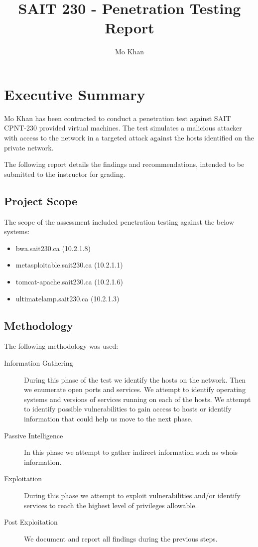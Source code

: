\documentclass{article}
\title{SAIT 230 - Penetration Testing Report}
\author{Mo Khan}
\begin{document}
\maketitle
\newpage
\tableofcontents
\newpage
{}

\section{Executive Summary}

Mo Khan has been contracted to conduct a penetration test against SAIT CPNT-230 provided
virtual machines. The test simulates a malicious attacker with access to the
network in a targeted attack against the hosts identified on the private network.

The following report details the findings and recommendations, intended to be submitted
to the instructor for grading.

\subsection{Project Scope}

The scope of the assessment included penetration testing against the below systems:

\begin{itemize}
  \item bwa.sait230.ca (10.2.1.8)
  \item metasploitable.sait230.ca (10.2.1.1)
  \item tomcat-apache.sait230.ca (10.2.1.6)
  \item ultimatelamp.sait230.ca (10.2.1.3)
\end{itemize}

\subsection{Methodology}

The following methodology was used:

\begin{description}
  \item[Information Gathering] During this phase of the test we identify the hosts on the network. Then we enumerate open ports and services. We attempt to identify operating systems and versions of services running on each of the hosts. We attempt to identify possible vulnerabilities to gain access to hosts or identify information that could help us move to the next phase.
  \item[Passive Intelligence] In this phase we attempt to gather indirect information such as whois information.
  \item[Exploitation] During this phase we attempt to exploit vulnerabilities and/or identify services to reach the highest level of privileges allowable.
  \item[Post Exploitation] We document and report all findings during the previous steps.
\end{description}
\end{document}
